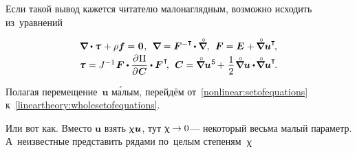 \begin{otherlanguage}{russian}

Если такой вывод кажется читателю мало\-нагляд\-ным, возможно исходить из~уравнений

\nopagebreak\vspace{-0.25em}\begin{equation}\label{nonlinear:setofequations}
\begin{array}{c}
\boldnabla \dotp \cauchystress \hspace{.15ex} + \rho \bm{f} = \hspace{.1ex} \bm{0} \hspace{.1ex}, \:\:
\boldnabla = \bm{F}^{-\T} \hspace{-0.2ex} \dotp \boldnablacircled , \:\:
\bm{F} = \bm{E} \hspace{.1ex} + \hspace{-0.1ex} \boldnablacircled {\bm{u}}^{\T} \hspace{-0.3ex},
\\[.2em]
\cauchystress \hspace{.1ex} = J^{-1} \hspace{0.2ex} \bm{F} \dotp \displaystyle \frac{\partial\hspace{.1ex} \Pi}{\partial\hspace{.1ex} \bm{C}} \dotp \bm{F}^{\hspace{.1ex}\T} \hspace{-0.4ex}, \:\:
\bm{C} = \boldnablacircled {\bm{u}}^{\hspace{.1ex}\mathsf{S}} \hspace{-0.2ex} + \hspace{0.2ex} \displaystyle \onehalf \hspace{0.2ex} \boldnablacircled \bm{u} \dotp \hspace{-0.25ex} \boldnablacircled \bm{u}^{\T} \hspace{-0.25ex}.
\end{array}
\end{equation}

\vspace{-0.1em}\noindent
Полагая перемещение~$\bm{u}$ м\'{а}лым, перейдём от~\eqref{nonlinear:setofequations} к~\eqref{lineartheory:wholesetofequations}.

Или вот как.
Вместо $\bm{u}$ взять $\upchi \bm{u}$, тут ${\upchi \hspace{-0.1ex}\to 0}$\:--- некоторый весьма малый параметр.
А~неизвестные представить рядами по~целым степеням~$\upchi$


\end{otherlanguage}
